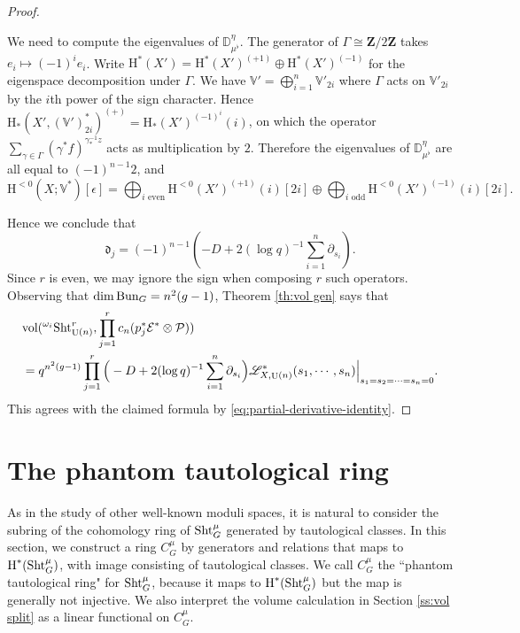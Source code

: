 \documentclass[reqno]{amsart}
\numberwithin{equation}{subsection}
\theoremstyle{definition}
\def\DD{\mathbb{D}}
\def\VV{\mathbb{V}}
\newcommand\cE{\mathcal{E}}
\newcommand\cP{\mathcal{P}}
\newcommand\frd{\mathfrak{d}}
\newcommand{\sL}{{\mathscr{L}}}
\newcommand{\Bun}{\textup{Bun}}
\newcommand\Sht{\textup{Sht}}
\newcommand{\vol}{\textup{vol}}
\DeclareMathOperator{\U}{U}
\newcommand\ot{\otimes}
\newcommand{\cohog}[2]{\textup{H}^{#1}({#2})}     %
\newcommand\pl{\partial}
\newcommand{\Z}{\mathbf{Z}}
\newcommand{\rH}{\ensuremath{\mathrm{H}}\xspace}
\begin{document}
\begin{proof}
\begin{itemize}
We need to compute the eigenvalues of $\DD_{\mu^\flat}^\eta$. The generator of $\Gamma \cong \Z/2\Z$ takes $e_i \mapsto (-1)^i e_i$. Write $\rH^*(X')  = \rH^*(X')^{(+1)} \oplus \rH^*(X')^{(-1)}$ for the eigenspace decomposition under $\Gamma$. We have $\VV'= \bigoplus_{i=1}^n \VV'_{2i}$ where $\Gamma$ acts on $\VV'_{2i}$ by the $i$th power of the sign character. Hence $\rH_*(X', (\VV')^*_{2i})^{(+)} = \rH_*(X')^{(-1)^{i}} (i)$, on which the operator $\sum_{\gamma \in \Gamma} (\gamma^* f)^{\gamma_*^{-1} z}$ acts as multiplication by $2$. Therefore the eigenvalues of $\DD_{\mu^\flat}^\eta$ are all equal to $(-1)^{n-1} 2$, and  
\[
\rH^{<0}(X; \VV^*)[\epsilon] = \bigoplus_{i \text{ even}}  \rH^{<0}(X')^{(+1)}(i)[2i] \oplus \bigoplus_{i \text{ odd}} \rH^{<0}(X')^{(-1)}(i)[2i].
\]
\end{itemize}
Hence we conclude that 
\begin{equation*}
\frd_{j} = (-1)^{n-1}(-D + 2(\log q)^{-1}\sum_{i=1}^{n} \pl_{s_{i}}).
\end{equation*}
Since $r$ is even, we may ignore the sign when composing $r$ such operators. Observing that $\dim \Bun_G = n^2(g-1)$, Theorem \ref{th:vol gen} says that 
\begin{align*}
& \vol({}^{\omega_i}\Sht^{r}_{\U(n)}, \prod_{j=1}^{r}c_{n}(p_{j}^{*}\cE^{*} \ot\cP))     \\
& = q^{n^2(g-1)}   \prod_{j=1}^r  \Big( -D+ 2(\log q)^{-1}\sum_{i=1}^{n} \pl_{s_{i}} \Big) \sL^{*}_{X,\U(n)}(s_{1},\cdots, s_{n})\Big|_{s_{1}=s_{2}=\cdots=s_{n}=0}.
\end{align*}
This agrees with the claimed formula by \eqref{eq:partial-derivative-identity}. 


\end{proof}

\section{The phantom tautological ring}

As in the study of other well-known moduli spaces, it is natural to consider the subring of the cohomology ring of $\Sht^{\mu}_G$ generated by tautological classes. In this section,  we construct a ring $C^{\mu}_G$ by generators and relations that maps to $\cohog{*}{\Sht^{\mu}_G}$, with image consisting of tautological classes. We call $C^{\mu}_G$ the ``phantom tautological ring" for $\Sht^{\mu}_G$, because it maps to $\cohog{*}{\Sht^{\mu}_G}$ but the map is generally not injective. We also interpret the volume calculation in Section \ref{ss:vol split} as a linear functional on $C^{\mu}_G$.
\end{document}

